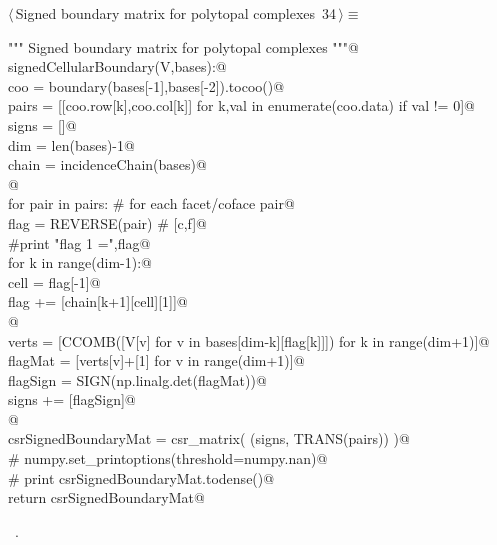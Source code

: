 \documentclass[11pt,oneside]{article}    %
\begin{document}
\begin{flushleft} \small \label{scrap54}
\protect{}$\langle\,$Signed boundary matrix for polytopal complexes\nobreak\ {\footnotesize 34}$\,\rangle\equiv$
\vspace{-1ex}
\begin{list}{}{} \item
\mbox{}\verb@""" Signed boundary matrix for polytopal complexes """@\\
\mbox{}\verb@def signedCellularBoundary(V,bases):@\\
\mbox{}\verb@    coo = boundary(bases[-1],bases[-2]).tocoo()@\\
\mbox{}\verb@    pairs = [[coo.row[k],coo.col[k]] for k,val in enumerate(coo.data) if val != 0]@\\
\mbox{}\verb@    signs = []@\\
\mbox{}\verb@    dim = len(bases)-1@\\
\mbox{}\verb@    chain = incidenceChain(bases)@\\
\mbox{}\verb@    @\\
\mbox{}\verb@    for pair in pairs:        # for each facet/coface pair@\\
\mbox{}\verb@        flag = REVERSE(pair) #  [c,f]@\\
\mbox{}\verb@        #print "flag 1 =",flag@\\
\mbox{}\verb@        for k in range(dim-1):@\\
\mbox{}\verb@            cell = flag[-1]@\\
\mbox{}\verb@            flag += [chain[k+1][cell][1]]@\\
\mbox{}\verb@        @\\
\mbox{}\verb@        verts = [CCOMB([V[v] for v in bases[dim-k][flag[k]]]) for k in range(dim+1)]@\\
\mbox{}\verb@        flagMat = [verts[v]+[1] for v in range(dim+1)]@\\
\mbox{}\verb@        flagSign = SIGN(np.linalg.det(flagMat))@\\
\mbox{}\verb@        signs += [flagSign]@\\
\mbox{}\verb@    @\\
\mbox{}\verb@    csrSignedBoundaryMat = csr_matrix( (signs, TRANS(pairs)) )@\\
\mbox{}\verb@    # numpy.set_printoptions(threshold=numpy.nan)@\\
\mbox{}\verb@    # print csrSignedBoundaryMat.todense()@\\
\mbox{}\verb@    return csrSignedBoundaryMat@\\
\mbox{}\verb@@{\NWsep}
\end{list}
\vspace{-1ex}
\footnotesize\addtolength{\baselineskip}{-1ex}
\begin{list}{}{\setlength{\itemsep}{-\parsep}\setlength{\itemindent}{-\leftmargin}}
\item \NWtxtMacroRefIn\ .
\end{list}
\end{flushleft}
\end{document}
